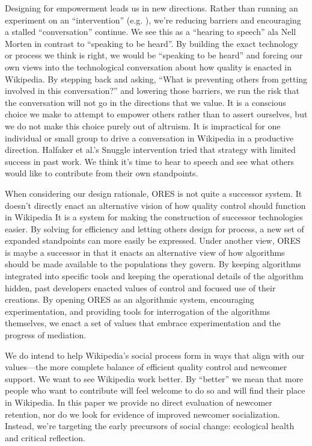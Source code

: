 Designing for empowerment leads us in new directions.  Rather than running an experiment on an ``intervention'' (e.g. \cite{halfaker2014snuggle}), we're reducing barriers and encouraging a stalled ``conversation'' continue.  We see this as a ``hearing to speech'' ala Nell Morten\cite{morton1985journey} in contrast to ``speaking to be heard''.  By building the exact technology or process we think is right, we would be ``speaking to be heard'' and forcing our own views into the technological conversation about how quality is enacted in Wikipedia.  By stepping back and asking, ``What is preventing others from getting involved in this conversation?'' and lowering those barriers, we run the risk that the conversation will not go in the directions that we value.  It is a conscious choice we make to attempt to empower others rather than to assert ourselves, but we do not make this choice purely out of altruism.  It is impractical for one individual or small group to drive a conversation in Wikipedia in a productive direction.  Halfaker et al.'s Snuggle intervention\cite{halfaker2014snuggle} tried that strategy with limited success in past work.  We think it's time to hear to speech and see what others would like to contribute from their own standpoints.

When considering our design rationale, ORES is not quite a successor system.  It doesn't directly enact an alternative vision of how quality control should function in Wikipedia  It is a system for making the construction of successor technologies easier.  By solving for efficiency and letting others design for process, a new set of expanded standpoints can more easily be expressed.  Under another view, ORES is maybe a successor in that it enacts an alternative view of how algorithms should be made available to the populations they govern.  By keeping algorithms integrated into specific tools and keeping the operational details of the algorithm hidden, past developers enacted values of control and focused use of their creations.  By opening ORES as an algorithmic system, encouraging experimentation, and providing tools for interrogation of the algorithms themselves, we enact a set of values that embrace experimentation and the progress of mediation.

We do intend to help Wikipedia's social process form in ways that align with our values---the more complete balance of efficient quality control and newcomer support.  We want to see Wikipedia work better. By ``better'' we mean that more people who want to contribute will feel welcome to do so and will find their place in Wikipedia.  In this paper we provide no direct evaluation of newcomer retention, nor do we look for evidence of improved newcomer socialization.  Instead, we're targeting the early precursors of social change: ecological health and critical reflection.

